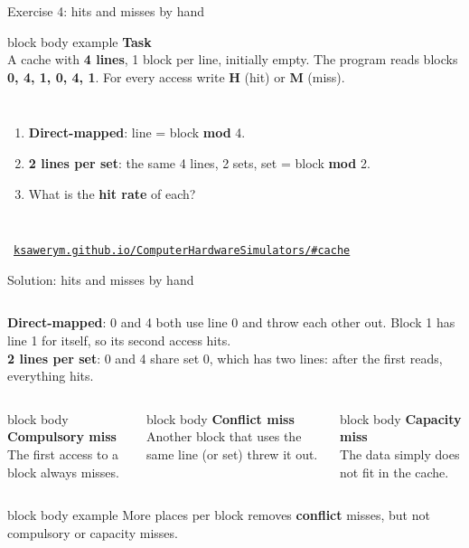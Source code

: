 \documentclass[aspectratio=169,10pt]{beamer}
\newcommand{\stepbox}[2]{%
  \begin{beamercolorbox}[rounded=true,sep=0.09cm,wd=\linewidth]{block body}
    \footnotesize\textbf{#1}\\ #2
  \end{beamercolorbox}\vspace{0.06cm}}
\newcommand{\taskhead}[2]{%
  \begin{beamercolorbox}[rounded=true,sep=0.12cm,wd=\linewidth]{block body example}
    \small\textbf{#1}\\[0.04cm]
    \footnotesize #2
  \end{beamercolorbox}\vspace{0.1cm}}
\newcommand{\keymsg}[1]{%
  \begin{beamercolorbox}[rounded=true,sep=0.1cm,wd=\textwidth]{block body example}
    \centering\footnotesize #1
  \end{beamercolorbox}}
\def\cw{0.62}
\def\chh{0.42}
\newcommand{\hmrow}[2]{%
  \foreach \s [count=\k from 0] in {#2} {%
    \node[hm-\s] at ({\k*\cw}, {-(#1)*\chh}) {\expandafter\ifstrequal\expandafter{\s}{Q}{?}{\s}};}}
\newcommand{\hmhead}[2]{%
  \foreach \s [count=\k from 0] in {#2}
    \node[hm-A] at ({\k*\cw}, {-(#1)*\chh}) {\s};}
\newcommand{\hmlabel}[2]{\node[anchor=east, font=\scriptsize, inner sep=1pt] at ({-0.5*\cw-0.08}, {-(#1)*\chh}) {#2};}
\newcommand{\hmresult}[3]{\node[anchor=west, font=\scriptsize\bfseries, text=nInk, inner sep=1pt]
  at ({(#2-0.5)*\cw+0.12}, {-(#1)*\chh}) {#3};}
\newcommand{\simbase}{https://ksawerym.github.io/ComputerHardwareSimulators/}
\newcommand{\simlink}[1]{\href{\simbase\##1}{\texttt{ksawerym.github.io/ComputerHardwareSimulators/\##1}}}
\newcommand{\simfoot}[1]{\par\vfill{\hfill\scriptsize\textcolor{gray}{\faLink\ #1}\par}}
\begin{document}
\begin{frame}{Exercise 4: hits and misses by hand}
  \taskhead{Task}{A cache with \textbf{4 lines}, 1 block per line, initially empty.
    The program reads blocks \textbf{0, 4, 1, 0, 4, 1}. For every access write \textbf{H} (hit) or \textbf{M} (miss).}
  \begin{columns}[T,onlytextwidth]
      \centering
      \footnotesize
      \begin{enumerate}\setlength{\itemsep}{3pt}
        \item \textbf{Direct-mapped}: line = block \textbf{mod} 4.
        \item \textbf{2 lines per set}: the same 4 lines, 2 sets, set = block \textbf{mod} 2.
        \item What is the \textbf{hit rate} of each?
      \end{enumerate}
  \end{columns}
  \simfoot{\simlink{cache}}
\end{frame}

\begin{frame}{Solution: hits and misses by hand}
  \begin{columns}[c,onlytextwidth]
      \centering
      \scriptsize
      \textbf{Direct-mapped}: 0 and 4 both use line 0 and throw each other out. Block 1 has line 1 for itself,
      so its second access hits.\\[0.1cm]
      \textbf{2 lines per set}: 0 and 4 share set 0, which has two lines: after the first reads, everything hits.
  \end{columns}
  \vspace{0.4cm}
  \begin{columns}[T,onlytextwidth]
      \stepbox{Compulsory miss}{The first access to a block always misses.}
      \stepbox{Conflict miss}{Another block that uses the same line (or set) threw it out.}
      \stepbox{Capacity miss}{The data simply does not fit in the cache.}
  \end{columns}
  \vfill
  \keymsg{More places per block removes \textbf{conflict} misses, but not compulsory or capacity misses.}
\end{frame}
\end{document}
